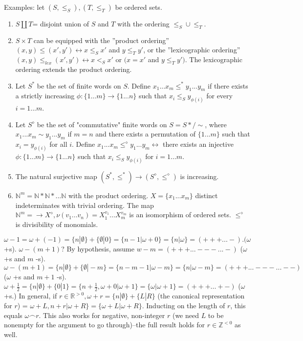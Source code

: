 Examples: let $(S, \leq_S), (T, \leq_T)$ be ordered sets.
\begin{enumerate}
  \item $S \coprod T$= disjoint union of $S$ and $T$ with the ordering $\leq_S \cup \leq_T$.
  \item $S \times T$ can be equipped with the ''product ordering'' $(x,y)\leq(x',y') \leftrightarrow x \leq_S x'$ and $y \leq_T y'$, or the ''lexicographic ordering'' $(x,y) \leq_{lex} (x',y') \leftrightarrow x <_S x'$ or $(x=x'$ and $y \leq_T y')$. The lexicographic ordering extends the product ordering.
  \item Let $S^*$ be the set of finite words on $S$. Define $x_{1}...x_{m} \leq^{*} y_{1}...y_{m}$ if there exists a strictly increasing $\phi: \{1...m\} \rightarrow \{1...n\}$ such that $x_i \leq_S y_{\phi(i)}$ for every $i=1...m$.
  \item Let $S^\diamond$ be the set of "commutative" finite words on $S=S*/ \sim$, where $x_{1}...x_{m} \sim y_{1}...y_{m}$ if $m=n$ and there exists a permutation of $\{1...m\}$ such that $x_i = y_{\phi(i)}$ for all $i$. Define  $x_{1}...x_{m} \leq^{\diamond} y_{1}...y_{m} \leftrightarrow$ there exists an injective $\phi: \{1...m\} \rightarrow \{1...n\}$ such that $x_i \leq_S y_{\phi(i)}$ for $i=1...m$.
  \item The natural surjective map $(S^*, \leq^*) \rightarrow (S^\diamond, \leq^\diamond)$ is increasing.
  \item $\mathbb{N}^m=\mathbb{N} * \mathbb{N} * ...\mathbb{N}$ with the product ordering. $X=\{x_1...x_m\}$ distinct indeterminates with trivial ordering. The map $\mathbb{N}^m= \rightarrow X^\diamond, \nu(v_1...v_n)=X_{1}^{v_1}...X_{m}^{v_m}$ is an isomorphism of ordered sets. $\leq^\diamond$ is divisibility of monomials.
\end{enumerate}
\WikiSigleStar  $\omega -1 = \omega + (-1) = \{n|\emptyset \} + \{\emptyset|0\}=\{n-1|\omega + 0\}= \{n|\omega\} = (+++...-). (\omega$ +s).
 $\omega - (m+1)$? By hypothesis, assume $w-m = (+++...---...-)$ ($\omega$ +s and $m$ -s). $\omega - (m+1)= \{n|\emptyset \} + \{\emptyset|-m\} = \{n-m-1|\omega -m\} = \{n|\omega-m\} = (+++...---...--)$ ($\omega$ +s and $m+1$ -s).
 $\omega + \frac{1}{2} = \{n|\emptyset \} + \{0|1\} = \{n + \frac{1}{2}, \omega + 0 | \omega +1\} = \{\omega | \omega +1\}=(+++...+-)$ ($\omega$ +s.)
 In general, if $r \in \mathbb{R}^{>0}, \omega + r = \{n|\emptyset \} + \{L|R\}$ (the canonical representation for $r$) = $\omega + L, n+r | \omega +R\} = \{\omega + L | \omega + R \}$. Inducting on the length of $r$, this equals $\omega \frown r$. This also works for negative, non-integer $r$ (we need $L$ to be nonempty for the argument to go through)--the full result holds for $r \in \mathbb{Z}^{<0}$ as well.
